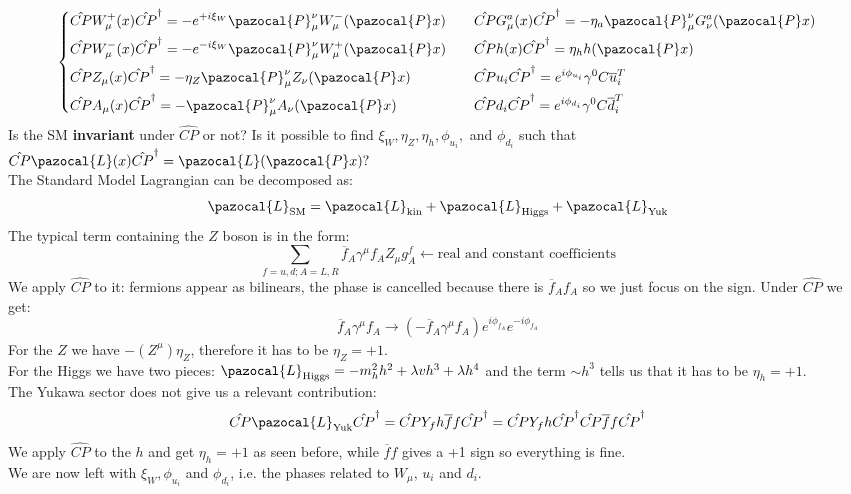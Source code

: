 \documentclass[../main.tex]{subfiles}
\begin{document}
\[
\left\{
\begin{aligned}
&\hat{CP}W_\mu^+(x)\hat{CP}^\dagger=-e^{+i\xi_W}\pazocal{P}_\mu^\nu W_\mu^-(\pazocal{P}x) \quad 
&&\hat{CP}G_\mu^a(x)\hat{CP}^\dagger=-\eta_a\pazocal{P}_\mu^\nu G_\nu^a(\pazocal{P}x)\\   
&\hat{CP}W_\mu^-(x)\hat{CP}^\dagger=-e^{-i\xi_W}\pazocal{P}_\mu^\nu W_\mu^+(\pazocal{P}x) \quad &&\hat{CP}h(x)\hat{CP}^\dagger=\eta_h h(\pazocal{P}x)\\
&\hat{CP}Z_\mu(x)\hat{CP}^\dagger=-\eta_Z\pazocal{P}_\mu^\nu Z_\nu(\pazocal{P}x) \quad &&\hat{CP}u_i\hat{CP}^\dagger=e^{i\phi_{u_i}}\gamma^0C\overline{u}_i^T\\
&\hat{CP}A_\mu(x)\hat{CP}^\dagger=-\pazocal{P}_\mu^\nu A_\nu(\pazocal{P}x) \quad &&\hat{CP}d_i\hat{CP}^\dagger=e^{i\phi_{d_i}}\gamma^0C\overline{d}_i^T
\end{aligned}
\right.
\]
Is the SM \textbf{invariant} under $\hat{CP}$ or not?  Is it possible to find $\xi_W, \eta_Z, \eta_h, \phi_{u_i},$ and $\phi_{d_i}$ such that $\hat{CP}\pazocal{L}(x)\hat{CP}^\dagger=\pazocal{L}(\pazocal{P}x)?$\\
The Standard Model Lagrangian can be decomposed as: 
\[
\pazocal{L}_{\text{SM}}=\pazocal{L}_{\text{kin}}+\pazocal{L}_{\text{Higgs}}+\pazocal{L}_{\text{Yuk}}
\]
The typical term containing the $Z$ boson is in the form:
\[
\sum_{f=u,d;A=L,R}\overline{f}_A\gamma^\mu f_AZ_\mu g_A^f\xleftarrow[]{}\text{real and constant coefficients}
\]
We apply $\hat{CP}$ to it: fermions appear as bilinears, the phase is cancelled because there is $\overline{f}_Af_A$ so we just focus on the sign. Under $\hat{CP}$ we get:
\[
\overline{f}_A\gamma^\mu f_A\xrightarrow[]{}(-\overline{f}_A\gamma^\mu f_A)e^{i\phi_{f_A}}e^{-i\phi_{f_A}}
\]
For the $Z$ we have $-(Z^\mu)\eta_Z$, therefore it has to be $\eta_Z=+1$.\\
For the Higgs we have two pieces: $\pazocal{L}_{\text{Higgs}}=-m_h^2h^2+\lambda vh^3+\lambda h^4$ and the term $\sim h^3$ tells us that it has to be $\eta_h=+1$.\\
The Yukawa sector does not give us a relevant contribution:
\[
\hat{CP}\pazocal{L}_{\text{Yuk}}\hat{CP}^\dagger=\hat{CP}Y_fh\overline{f}f\hat{CP}^\dagger=\hat{CP}Y_fh\hat{CP}^\dagger\hat{CP}\overline{f}f\hat{CP}^\dagger
\]
We apply $\hat{CP}$ to the $h$ and get $\eta_h=+1$ as seen before, while $\overline{f}f$ gives a +1 sign so everything is fine.\\
We are now left with $\xi_W, \phi_{u_i}$ and $\phi_{d_i}$, i.e. the phases related to $W_\mu$, $u_i$ and $d_i$.
\end{document}
